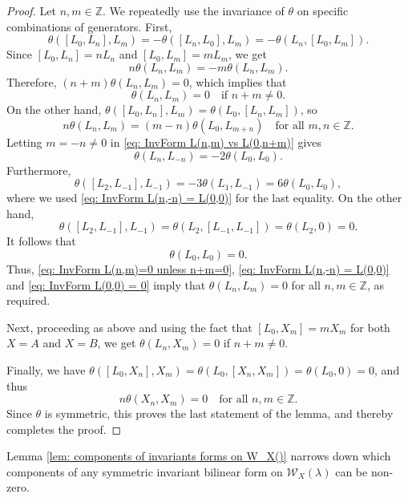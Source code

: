 \documentclass[11pt, svgnames]{amsart}
\newcommand{\ZZ}{\mathbb{Z}}
\newcommand{\W}{\mathcal{W}}
\theoremstyle{definition}
\begin{document}
\begin{proof}
    Let $n,m \in \ZZ$. We repeatedly use the invariance of $\theta$ on specific combinations of generators. First,
    $$\theta([L_0,L_n], L_m) = -\theta([L_n,L_0],L_m) = -\theta(L_n, [L_0,L_m]).$$
    Since $[L_0,L_n] = nL_n$ and $[L_0,L_m] = mL_m$, we get
    $$n \theta(L_n, L_m) = -m\theta(L_n, L_m).$$
    Therefore, $(n+m)\theta (L_n, L_m) = 0$, which implies that
    \begin{equation}\label{eq: InvForm L(n,m)=0 unless n+m=0}
        \theta(L_n, L_m) = 0 \quad \text{if } n + m \neq 0.
    \end{equation}
    On the other hand, $\theta([L_0,L_n], L_m) = \theta(L_0,[L_n, L_m])$, so
    \begin{equation}\label{eq: InvForm L(n,m) vs L(0,n+m)}
        n\theta(L_n,L_m) = (m-n)\theta(L_0, L_{m+n}) \quad \text{for all } m,n \in \ZZ.
    \end{equation}
    Letting $m = -n \neq 0$ in \eqref{eq: InvForm L(n,m) vs L(0,n+m)} gives
    \begin{equation}\label{eq: InvForm L(n,-n) = L(0,0)}
        \theta(L_n,L_{-n}) = -2\theta(L_0,L_0).
    \end{equation}
    Furthermore, 
    $$\theta([L_2,L_{-1}],L_{-1}) = -3\theta(L_1, L_{-1}) = 6\theta(L_0, L_0),$$
    where we used \eqref{eq: InvForm L(n,-n) = L(0,0)} for the last equality. On the other hand,
    $$\theta([L_2,L_{-1}],L_{-1}) = \theta(L_2,[L_{-1},L_{-1}]) = \theta(L_2,0) = 0.$$
    It follows that
    \begin{equation}
    \label{eq: InvForm L(0,0) = 0}
        \theta(L_0,L_0) = 0.
    \end{equation}
    Thus, \eqref{eq: InvForm L(n,m)=0 unless n+m=0}, \eqref{eq: InvForm L(n,-n) = L(0,0)} and \eqref{eq: InvForm L(0,0) = 0} imply that $\theta(L_n, L_m) = 0$ for all $n,m\in\ZZ$, as required.
    
    Next, proceeding as above and using the fact that $[L_0, X_m] = m X_m$ for both $X=A$ and $X=B$, we get $\theta(L_n, X_m) = 0$ if $n + m \neq 0$.
    
    Finally, we have $\theta([L_0,X_n],X_m) = \theta(L_0,[X_n, X_m]) = \theta(L_0,0) = 0$, and thus
    $$n\theta(X_n, X_m) = 0 \quad \text{for all } n,m \in \ZZ.$$
    Since $\theta$ is symmetric, this proves the last statement of the lemma, and thereby completes the proof.
\end{proof}

Lemma \ref{lem: components of invariants forms on W_X()} narrows down which components of any symmetric invariant bilinear form on $\W_X(\lambda)$ can be non-zero. 
\end{document}
